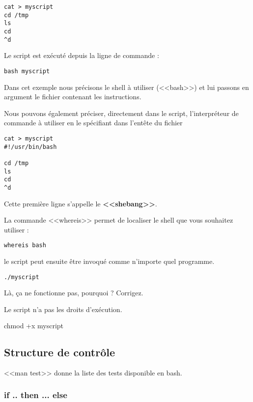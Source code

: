 \documentclass[11pt]{article}
\begin{document}
\begin{lstlisting}
cat > myscript
cd /tmp
ls
cd
^d
\end{lstlisting}

Le script est exécuté depuis la ligne de commande :

\begin{lstlisting}
bash myscript
\end{lstlisting}

Dans cet exemple nous précisons le shell à utiliser (<<bash>>) et lui passons en argument le fichier contenant les instructions.

Nous pouvons également préciser, directement dans le script, l'interpréteur de commande à utiliser en le spécifiant dans l'entête du fichier

\begin{lstlisting}
cat > myscript
#!/usr/bin/bash

cd /tmp
ls
cd
^d
\end{lstlisting}

Cette première ligne s'appelle le \textbf{<<shebang>>}.

La commande <<whereis>> permet de localiser le shell que vous souhaitez utiliser :

\begin{lstlisting}
whereis bash
\end{lstlisting}

le script peut ensuite être invoqué comme n'importe quel programme.

\begin{lstlisting}
./myscript
\end{lstlisting}

Là, ça ne fonctionne pas, pourquoi ? Corrigez.

\begin{solution}
Le script n'a pas les droits d'exécution. 

chmod +x myscript
\end{solution}

\subsection{Structure de contrôle}

<<man test>> donne la liste des tests disponible en bash.

\subsubsection{if .. then ... else}
\end{document}
